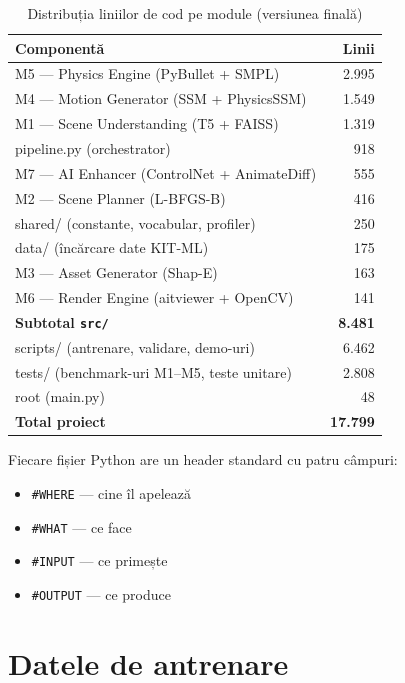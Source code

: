 \begin{table}[h]
\centering
\begin{tabular}{l r}
\hline
\textbf{Componentă} & \textbf{Linii} \\
\hline
M5 --- Physics Engine (PyBullet + SMPL) & 2.995 \\
M4 --- Motion Generator (SSM + PhysicsSSM) & 1.549 \\
M1 --- Scene Understanding (T5 + FAISS) & 1.319 \\
pipeline.py (orchestrator) & 918 \\
M7 --- AI Enhancer (ControlNet + AnimateDiff) & 555 \\
M2 --- Scene Planner (L-BFGS-B) & 416 \\
shared/ (constante, vocabular, profiler) & 250 \\
data/ (încărcare date KIT-ML) & 175 \\
M3 --- Asset Generator (Shap-E) & 163 \\
M6 --- Render Engine (aitviewer + OpenCV) & 141 \\
\hline
\textbf{Subtotal \texttt{src/}} & \textbf{8.481} \\
\hline
scripts/ (antrenare, validare, demo-uri) & 6.462 \\
tests/ (benchmark-uri M1--M5, teste unitare) & 2.808 \\
root (main.py) & 48 \\
\hline
\textbf{Total proiect} & \textbf{17.799} \\
\hline
\end{tabular}
\caption{Distribuția liniilor de cod pe module (versiunea finală)}
\label{tab:loc}
\end{table}

Fiecare fișier Python are un header standard cu patru câmpuri:
\begin{itemize}
    \item \texttt{\#WHERE} --- cine îl apelează
    \item \texttt{\#WHAT} --- ce face
    \item \texttt{\#INPUT} --- ce primește
    \item \texttt{\#OUTPUT} --- ce produce
\end{itemize}

\section{Datele de antrenare}

